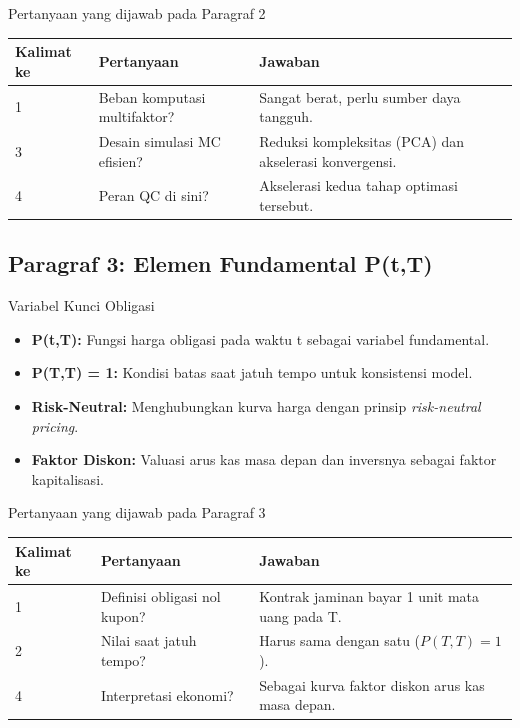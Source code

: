 \begin{frame}{Pertanyaan yang dijawab pada Paragraf 2}
    \centering
    \small
    \begin{tabular}{lp{4.5cm}p{6cm}}
        \toprule
        Kalimat ke & Pertanyaan & Jawaban \\
        \midrule
        1 & Beban komputasi multifaktor? & Sangat berat, perlu sumber daya tangguh. \\
        3 & Desain simulasi MC efisien? & Reduksi kompleksitas (PCA) dan akselerasi konvergensi. \\
        4 & Peran QC di sini? & Akselerasi kedua tahap optimasi tersebut. \\
        \bottomrule
    \end{tabular}
\end{frame}

\subsection{Paragraf 3: Elemen Fundamental P(t,T)}
\begin{frame}{Variabel Kunci Obligasi}
    \begin{itemize}
        \item \textbf{P(t,T):} Fungsi harga obligasi pada waktu t sebagai variabel fundamental.
        \item \textbf{P(T,T) = 1:} Kondisi batas saat jatuh tempo untuk konsistensi model.
        \item \textbf{Risk-Neutral:} Menghubungkan kurva harga dengan prinsip \textit{risk-neutral pricing}.
        \item \textbf{Faktor Diskon:} Valuasi arus kas masa depan dan inversnya sebagai faktor kapitalisasi.
    \end{itemize}
\end{frame}

\begin{frame}{Pertanyaan yang dijawab pada Paragraf 3}
    \centering
    \small
    \begin{tabular}{lp{4.5cm}p{6cm}}
        \toprule
        Kalimat ke & Pertanyaan & Jawaban \\
        \midrule
        1 & Definisi obligasi nol kupon? & Kontrak jaminan bayar 1 unit mata uang pada T. \\
        2 & Nilai saat jatuh tempo? & Harus sama dengan satu ($P(T,T)=1$). \\
        4 & Interpretasi ekonomi? & Sebagai kurva faktor diskon arus kas masa depan. \\
        \bottomrule
    \end{tabular}
\end{frame}

